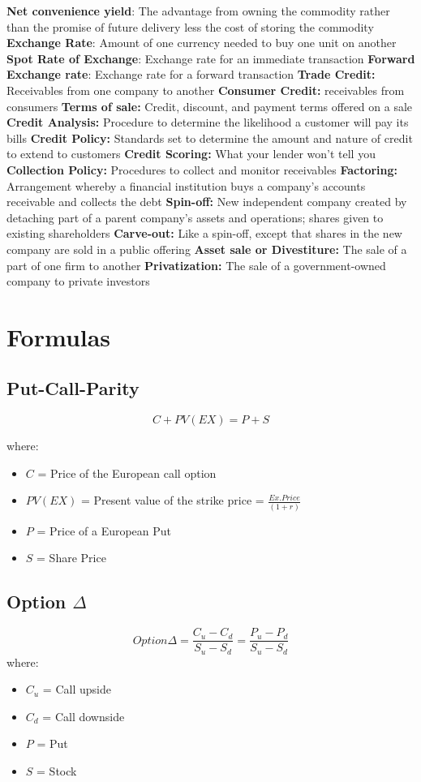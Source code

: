 \documentclass{cheatsheet}
\begin{document}
    \textbf{Net convenience yield}: The advantage from owning the commodity rather than the promise of future delivery less the cost of storing the commodity
    \textbf{Exchange Rate}: Amount of one currency needed to buy one unit on another
    \textbf{Spot Rate of Exchange}: Exchange rate for an immediate transaction
    \textbf{Forward Exchange rate}: Exchange rate for a forward transaction
    \textbf{Trade Credit:} Receivables from one company to another
    \textbf{Consumer Credit:} receivables from consumers
    \textbf{Terms of sale:} Credit, discount, and payment terms offered on a sale
    \textbf{Credit Analysis:} Procedure to determine the likelihood a customer will pay its bills
    \textbf{Credit Policy:} Standards set to determine the amount and nature of credit to extend to customers
    \textbf{Credit Scoring:} What your lender won’t tell you
    \textbf{Collection Policy:} Procedures to collect and monitor receivables
    \textbf{Factoring:} Arrangement whereby a financial institution buys a company's accounts receivable and collects the debt
    \textbf{Spin-off:} New independent company created by detaching part of a parent company’s assets and operations; shares given to existing shareholders
    \textbf{Carve-out:} Like a spin-off, except that shares in the new company are sold in a public offering
    \textbf{Asset sale or Divestiture:} The sale of a part of one firm to another
    \textbf{Privatization:} The sale of a government-owned company to private investors

\section*{Formulas}
\subsection{Put-Call-Parity}
    \[
C + PV(EX) = P + S
\]

\noindent where:
\begin{itemize}
  \item $C$ = Price of the European call option
  \item $PV(EX)$ = Present value of the strike price = $\frac{Ex.Price}{(1+r)}$
  \item $P$ = Price of a European Put
  \item $S$ = Share Price
\end{itemize}
\subsection{Option $\Delta$}
\[Option \Delta = \frac{C_u - C_d}{S_u - S_d} = \frac{P_u - P_d}{S_u - S_d}\]
\noindent where:
\begin{itemize}
  \item $C_u$ = Call upside
  \item $C_d$ = Call downside
  \item $P$ = Put
  \item $S$ = Stock
\end{itemize}
\end{document}
